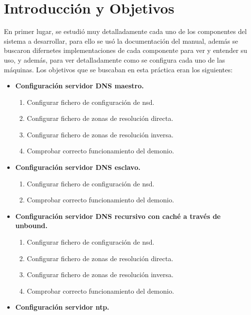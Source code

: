 \documentclass{article}
\begin{document}
\section{Introducción y Objetivos}
En primer lugar, se estudió muy detalladamente cada uno de los componentes del sistema a desarrollar, para ello se usó la documentación del manual, además se buscaron difernetes implementaciones de cada componente para ver y entender su uso, y además, para ver detalladamente como se configura cada uno de las máquinas. 
Los objetivos que se buscaban en esta práctica eran los siguientes:
\begin{center}
\begin{itemize}
	\item \textbf{Configuración servidor DNS maestro.}
		\begin{enumerate}
			\item Configurar fichero de configuración de nsd.
			\item Configurar fichero de zonas de resolución directa.
			\item Configurar fichero de zonas de resolución inversa.
			\item Comprobar correcto funcionamiento del demonio.
		\end{enumerate}
	\item \textbf{Configuración servidor DNS esclavo.}
		\begin{enumerate}
			\item Configurar fichero de configuración de nsd.
			\item Comprobar correcto funcionamiento del demonio.
		\end{enumerate}
	\item \textbf{Configuración servidor DNS recursivo con caché a través de unbound.}
		\begin{enumerate}
			\item Configurar fichero de configuración de nsd.
			\item Configurar fichero de zonas de resolución directa.
			\item Configurar fichero de zonas de resolución inversa.
			\item Comprobar correcto funcionamiento del demonio.
		\end{enumerate}
	\item \textbf{Configuración servidor ntp.}

\end{itemize}
\end{center}
\end{document}
